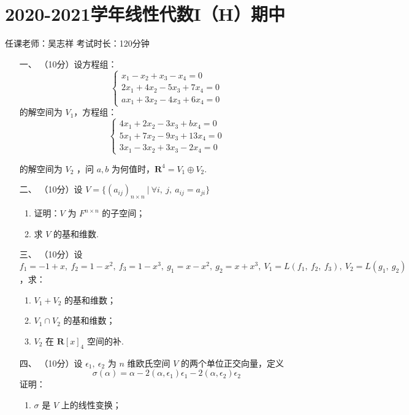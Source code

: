 \section*{2020-2021学年线性代数I（H）期中}

\begin{center}
    任课老师：吴志祥\hspace{4em} 考试时长：120分钟
\end{center}
\begin{enumerate}
	\item[一、]（10分）设方程组：
    \[\begin{cases}
        x_1-x_2+x_3-x_4=0 \\ 2x_1+4x_2-5x_3+7x_4=0\\ax_1+3x_2-4x_3+6x_4=0
    \end{cases}\]
    的解空间为 $V_1$，方程组：
    \[\begin{cases}
        4x_1+2x_2-3x_3+bx_4=0 \\ 5x_1+7x_2-9x_3+13x_4=0\\3x_1-3x_2+3x_3-2x_4=0
    \end{cases}\]

    的解空间为 $V_2$ ，问 $a,b$ 为何值时，$\mathbf{R}^4=V_1 \oplus V_2$.
	\item[二、]（10分）设 $V=\{(a_{ij})_{n \times n}\ |\ \forall i,\ j,\ a_{ij}=a_{ji}\}$
    \begin{enumerate}[label=(\arabic*)]
        \item 证明：$V$ 为 $F^{n \times n}$ 的子空间；

        \item 求 $V$ 的基和维数.
    \end{enumerate}
	\item[三、]（10分）设 $f_1=-1+x,\ f_2=1-x^2,\ f_3=1-x^3,\ g_1=x-x^2,\ g_2=x+x^3,\ V_1=L\left(f_1,\ f_2,\ f_3\right),\ V_2=L\left(g_1,\ g_2\right)$，求：
    \begin{enumerate}[label=(\arabic*)]
        \item $V_1+V_2$ 的基和维数；

        \item $V_1 \cap V_2$ 的基和维数；

        \item $V_2$ 在 $\mathbf{R}[x]_4$ 空间的补.
    \end{enumerate}
	\item[四、]（10分）设 $\epsilon_1,\ \epsilon_2$ 为 $n$ 维欧氏空间 $V$ 的两个单位正交向量，定义
    \[\sigma(\alpha)=\alpha-2(\alpha,\epsilon_1)\epsilon_1-2(\alpha,\epsilon_2)\epsilon_2\]
    证明：
    \begin{enumerate}
        \item $\sigma$ 是 $V$ 上的线性变换；


\end{enumerate}
\end{enumerate}
